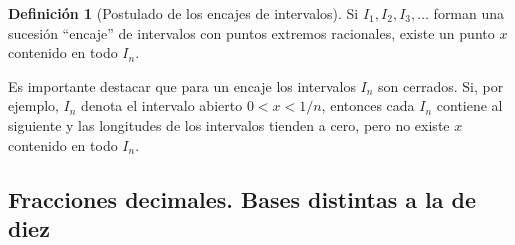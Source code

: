 \documentclass[12pt]{book}
\theoremstyle{definition}
\newtheorem{definition}{Definición}[section]
\begin{document}
\begin{definition}[Postulado de los encajes de intervalos]
Si $I_1, I_2, I_3, \dots$ forman una sucesión ``encaje'' de intervalos con puntos extremos racionales, existe un punto $x$ contenido en todo $I_n$.
\end{definition}

Es importante destacar que para un encaje los intervalos $I_n$ son cerrados. Si, por ejemplo, $I_n$ denota el intervalo abierto $0 < x < 1/n$, entonces cada $I_n$ contiene al siguiente y las longitudes de los intervalos tienden a cero, pero no existe $x$ contenido en todo $I_n$.

\subsection{Fracciones decimales. Bases distintas a la de diez}
\end{document}
